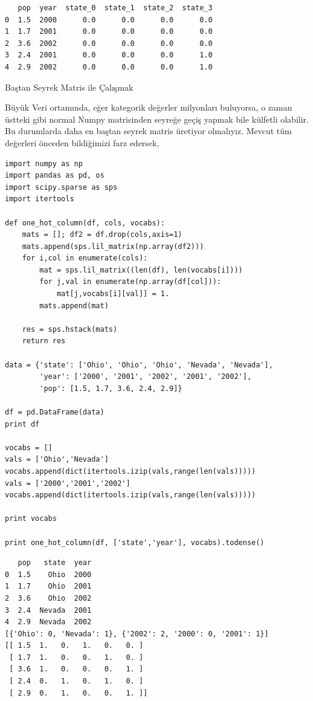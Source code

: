 \documentclass[12pt,fleqn]{article}\usepackage{../../common}
\begin{document}
\begin{verbatim}
   pop  year  state_0  state_1  state_2  state_3
0  1.5  2000      0.0      0.0      0.0      0.0
1  1.7  2001      0.0      0.0      0.0      0.0
2  3.6  2002      0.0      0.0      0.0      0.0
3  2.4  2001      0.0      0.0      0.0      1.0
4  2.9  2002      0.0      0.0      0.0      1.0
\end{verbatim}

Baştan Seyrek Matris ile Çalışmak

Büyük Veri ortamında, eğer kategorik değerler milyonları buluyorsa, o zaman
üstteki gibi normal Numpy matrisinden seyreğe geçiş yapmak bile külfetli
olabilir. Bu durumlarda daha en baştan seyrek matris üretiyor
olmalıyız. Mevcut tüm değerleri önceden bildiğimizi farz edersek,

\begin{verbatim}
import numpy as np
import pandas as pd, os
import scipy.sparse as sps
import itertools

def one_hot_column(df, cols, vocabs):
    mats = []; df2 = df.drop(cols,axis=1)
    mats.append(sps.lil_matrix(np.array(df2)))
    for i,col in enumerate(cols):
        mat = sps.lil_matrix((len(df), len(vocabs[i])))
        for j,val in enumerate(np.array(df[col])):
            mat[j,vocabs[i][val]] = 1.
        mats.append(mat)

    res = sps.hstack(mats)    
    return res
            
data = {'state': ['Ohio', 'Ohio', 'Ohio', 'Nevada', 'Nevada'],
        'year': ['2000', '2001', '2002', '2001', '2002'],
        'pop': [1.5, 1.7, 3.6, 2.4, 2.9]}

df = pd.DataFrame(data)
print df

vocabs = []
vals = ['Ohio','Nevada']
vocabs.append(dict(itertools.izip(vals,range(len(vals)))))
vals = ['2000','2001','2002']
vocabs.append(dict(itertools.izip(vals,range(len(vals)))))

print vocabs

print one_hot_column(df, ['state','year'], vocabs).todense()
\end{verbatim}

\begin{verbatim}
   pop   state  year
0  1.5    Ohio  2000
1  1.7    Ohio  2001
2  3.6    Ohio  2002
3  2.4  Nevada  2001
4  2.9  Nevada  2002
[{'Ohio': 0, 'Nevada': 1}, {'2002': 2, '2000': 0, '2001': 1}]
[[ 1.5  1.   0.   1.   0.   0. ]
 [ 1.7  1.   0.   0.   1.   0. ]
 [ 3.6  1.   0.   0.   0.   1. ]
 [ 2.4  0.   1.   0.   1.   0. ]
 [ 2.9  0.   1.   0.   0.   1. ]]
\end{verbatim}
\end{document}
